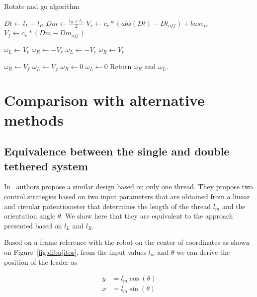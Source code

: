 \documentclass[journal]{IEEEtran}
\begin{document}
\begin{algorithm}[]
\caption{Rotate and go algorithm}
\begin{algorithmic}
\STATE $Dt \gets l_L - l_R$
\STATE $Dm \gets \frac{l_R+l_L}{2}$
\STATE $V_r \gets c_r * (abs(Dt) - Dt_{off}) + base_{vr}$ 
\STATE $V_f \gets c_v * (Dm - Dm_{off})$

\STATE $\omega_{L} \gets V_r$
\STATE $\omega_{R} \gets -V_r$
\ELSE
\STATE $\omega_{L} \gets -V_r$
\STATE $\omega_{R} \gets V_r$
\ENDIF

\ELSE
{}
\STATE $\omega_{R} \gets V_f$
\STATE $\omega_{L} \gets V_f$
\ELSE
\STATE $\omega_{R} \gets 0$
\STATE $\omega_{L} \gets 0$
\ENDIF
\ENDIF
\STATE Return $\omega_{R}$ and $\omega_{L}$.
\end{algorithmic}
\label{alg:rotateandgoalg}
\end{algorithm}

\section{Comparison with alternative methods} \label{Comparison}

\subsection{Equivalence between the single and double tethered system}


In~\cite{Endo2015} authors propose a similar design based on only one thread.  They propose two control strategies based on two input parameters that are obtained from a linear and circular potentiometer that determines the length of the thread $l_m$ and the orientation angle $\theta$.  We show here that they are equivalent to the approach presented based on $l_L$ and  $l_R$.

Based on a frame reference with the robot on the center of coordinates as shown on Figure~\ref{fig:dibujitos}, from the input values $l_m$ and $\theta$ we can derive the position of the leader as

\begin{align*}
   y &= l_m  \cos(\theta)\\
   x &= l_m  \sin(\theta) \\
\end{align*}
\end{document}
